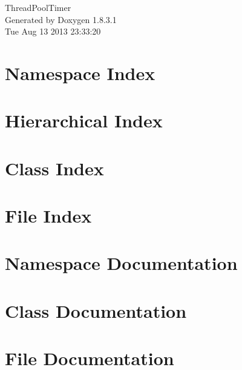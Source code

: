 \documentclass{book}
\begin{document}
\hypersetup{pageanchor=false,citecolor=blue}
\begin{titlepage}
\vspace*{7cm}
\begin{center}
{\Large Thread\-Pool\-Timer }\\
\vspace*{1cm}
{\large Generated by Doxygen 1.8.3.1}\\
\vspace*{0.5cm}
{\small Tue Aug 13 2013 23:33:20}\\
\end{center}
\end{titlepage}
\clearemptydoublepage
{}
\tableofcontents
\clearemptydoublepage
{}
\hypersetup{pageanchor=true,citecolor=blue}
\chapter{Namespace Index}

\chapter{Hierarchical Index}

\chapter{Class Index}

\chapter{File Index}

\chapter{Namespace Documentation}

\chapter{Class Documentation}





\chapter{File Documentation}










\printindex
\end{document}
